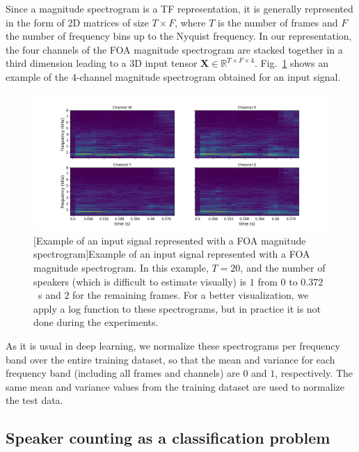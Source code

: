 Since a magnitude spectrogram is a TF representation, it is generally represented in the form of 2D matrices of size $T \times F$, where $T$ is the number of frames and $F$ the number of frequency bins up to the Nyquist frequency. In our representation, the four channels of the FOA magnitude spectrogram are stacked together in a third dimension leading to a 3D input tensor $\mathbf{X} \in \mathbb{R}^{T \times F \times 4}$. Fig.~\ref{fig:foaMagnitudeSpectrograms} shows an example of the 4-channel magnitude spectrogram obtained for an input signal.

\begin{figure}[t]
    \begin{center}
    \includegraphics[width=1.\linewidth]{Images/chap5/foaMagnitudeSpectrograms.png}
    [Example of an input signal represented with a FOA magnitude spectrogram]{Example of an input signal represented with a FOA magnitude spectrogram. In this example, $T = 20$, and the number of speakers (which is difficult to estimate visually) is $1$ from $0$ to $0.372$~s and $2$ for the remaining frames. For a better visualization, we apply a log function to these spectrograms, but in practice it is not done during the experiments.}
    \label{fig:foaMagnitudeSpectrograms}
    \end{center}
\end{figure}

As it is usual in deep learning, we normalize these spectrograms per frequency band over the entire training dataset, so that the mean and variance for each frequency band (including all frames and channels) are $0$ and $1$, respectively. The same mean and variance values from the training dataset are used to normalize the test data.

\subsection{Speaker counting as a classification problem}

